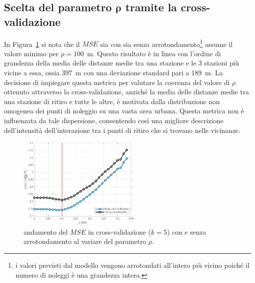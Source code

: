 \subsection{Scelta del parametro $\boldsymbol{\rho}$ tramite la cross-validazione}
In Figura~\ref{MSE_cv} si nota che il $MSE$ sia con sia senza arrotondamento\footnote{i valori previsti dal modello vengono arrotondati all'intero più vicino poiché il numero di noleggi è una grandezza intera.} assume il valore minimo per $\rho=100$~\unit{\meter}. Questo risultato è in linea con l'ordine di grandezza della media delle distanze medie tra una stazione e le \num{3} stazioni più vicine a essa, ossia \num{397}~\unit{\meter} con una deviazione standard pari a \num{189}~\unit{\meter}. La decisione di impiegare questa metrica per valutare la coerenza del valore di $\rho$ ottenuto attraverso la cross-validazione, anziché la media delle distanze medie tra una stazione di ritiro e tutte le altre, è motivata dalla distribuzione non omogenea dei punti di noleggio su una vasta area urbana. Questa metrica non è influenzata da tale dispersione, consentendo così una migliore descrizione dell'intensità dell'interazione tra i punti di ritiro che si trovano nelle vicinanze.

\begin{figure}[htpb]
	\centering
	\includegraphics[height=170px]{Immagini/4. Caso di studio/Cross_validazione/MSE_rho_full_focus}
	\caption[Andamento del $MSE$ in cross-validazione con e senza arrotondamento al variare del parametro $\rho$]{andamento del $MSE$ in cross-validazione ($k=5$) con e senza arrotondamento al variare del parametro $\rho$.}
	\label{MSE_cv}
\end{figure}

